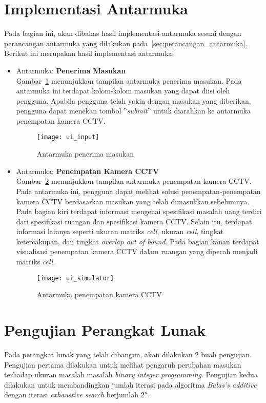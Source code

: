 \section{Implementasi Antarmuka}
Pada bagian ini, akan dibahas hasil implementasi antarmuka sesuai dengan perancangan antarmuka yang dilakukan pada~\ref{sec:perancangan_antarmuka}. Berikut ini merupakan hasil implementasi antarmuka:
\begin{itemize}
	\item Antarmuka: \textbf{Penerima Masukan}\\
	Gambar~\ref{fig:ui_input} menunjukkan tampilan antarmuka penerima masukan. Pada antarmuka ini terdapat kolom-kolom masukan yang dapat diisi oleh pengguna. Apabila pengguna telah yakin dengan masukan yang diberikan, pengguna dapat menekan tombol ''\textit{submit}'' untuk diarahkan ke antarmuka penempatan kamera CCTV.
	\begin{figure}[H]
		\centering  
		\texttt{[image: ui\_input]}
		\caption[Antarmuka penerima masukan]{Antarmuka penerima masukan}
		\label{fig:ui_input}
	\end{figure}
	
	\item Antarmuka: \textbf{Penempatan Kamera CCTV}\\
	Gambar~\ref{fig:ui_simulator} menunjukkan tampilan antarmuka penempatan kamera CCTV. Pada antarmuka ini, pengguna dapat melihat solusi penempatan-penempatan kamera CCTV berdasarkan masukan yang telah dimasukkan sebelumnya. Pada bagian kiri terdapat informasi mengenai spesifikasi masalah uang terdiri dari spesifikasi ruangan dan spesifikasi kamera CCTV. Selain itu, terdapat informasi lainnya seperti ukuran matriks \textit{cell}, ukuran \textit{cell}, tingkat ketercakupan, dan tingkat \textit{overlap out of bound}. Pada bagian kanan terdapat visualisasi penempatan kamera CCTV dalam ruangan yang dipecah menjadi matriks \textit{cell}.
	\begin{figure}[H]
		\centering  
		\texttt{[image: ui\_simulator]}
		\caption[Antarmuka penempatan kamera CCTV]{Antarmuka penempatan kamera CCTV}
		\label{fig:ui_simulator}
	\end{figure}
\end{itemize}

\section{Pengujian Perangkat Lunak}
Pada perangkat lunak yang telah dibangun, akan dilakukan 2 buah pengujian. Pengujian pertama dilakukan untuk melihat pengaruh perubahan masukan terhadap ukuran masalah masalah \textit{binary integer programming}. Pengujian kedua dilakukan untuk membandingkan jumlah iterasi pada algoritma \textit{Balas's additive} dengan iterasi \textit{exhaustive search} berjumlah \(2^n\).

